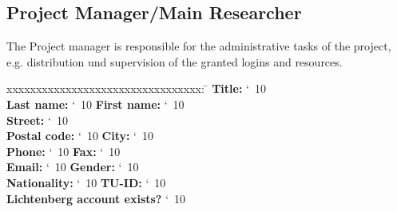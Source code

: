 \documentclass[accentcolor=tud9c,nochapname,11pt]{tudexercise}
\makeatletter
\newcommand\saferead[1]{%
  \bgroup
  \let\do\@makeother
  \dospecials\catcode`\ 10
  \egroup 
}
\makeatother
\begin{document}
\begin{Form}
\subsection{Project Manager/Main Researcher}
The Project manager is responsible for the administrative tasks of the project, e.g. distribution und supervision of the granted logins and resources.   \\
\begin{tabbing}
xxxxxxxxxxxxxxxxxxxxxxxxxxxxxxxxx:  \= \kill
\textbf{Title:}  \saferead{pm_title.txt} \\
\textbf{Last name:} \saferead{pm_lname.txt} \> \>  \textbf{First name:} \saferead{pm_fname.txt}  \\
\textbf{Street:} \saferead{pm_street.txt}  \\
\textbf{Postal code:} \saferead{pm_pcode.txt}   \> \> \textbf{City:} \saferead{pm_city.txt} \\
\textbf{Phone:} \saferead{pm_phone.txt}  \> \> \textbf{Fax:} \saferead{pm_fax.txt}   \\
\textbf{Email:} \saferead{pm_email.txt}  \> \> \textbf{Gender:}  \saferead{pm_gender.txt}    \\
\textbf{Nationality:} \saferead{pm_nat.txt}  \> \>  \textbf{TU-ID:}  \saferead{pm_tuid.txt} \\
\textbf{Lichtenberg account exists?} \saferead{pm_lichtacc.txt}
\end{tabbing}

\end{Form}
\end{document}
